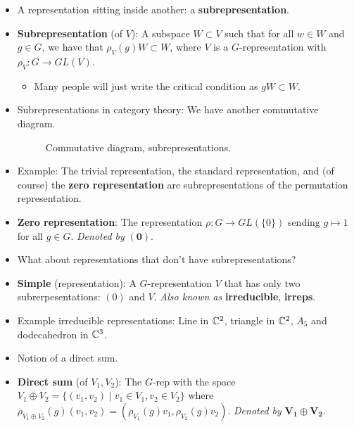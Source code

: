 \documentclass[../notes.tex]{subfiles}
\begin{document}
\begin{itemize}
    \item A representation sitting inside another: a \textbf{subrepresentation}.
    \item \textbf{Subrepresentation} (of $V$): A subspace $W\subset V$ such that for all $w\in W$ and $g\in G$, we have that $\rho_V(g)W\subset W$, where $V$ is a $G$-representation with $\rho_V:G\to GL(V)$.
    \begin{itemize}
        \item Many people will just write the critical condition as $gW\subset W$.
    \end{itemize}
    \item Subrepresentations in category theory: We have another commutative diagram.
    \begin{figure}[h!]
        \centering
        \DisableQuotes
        \EnableQuotes
        \vspace{-1.5em}
        \caption{Commutative diagram, subrepresentations.}
        \label{fig:CDsubreps}
    \end{figure}
    \item Example: The trivial representation, the standard representation, and (of course) the \textbf{zero representation} are subrepresentations of the permutation representation.
    \item \textbf{Zero representation}: The representation $\rho:G\to GL(\{0\})$ sending $g\mapsto 1$ for all $g\in G$. \emph{Denoted by} $\bm{(0)}$.
    \item What about representations that don't have subrepresentations?
    \item \textbf{Simple} (representation): A $G$-representation $V$ that has only two subrerpesentations: $(0)$ and $V$. \emph{Also known as} \textbf{irreducible}, \textbf{irreps}.
    \item Example irreducible representations: Line in $\mathbb{C}^2$, triangle in $\mathbb{C}^2$, $A_5$ and dodecahedron in $\mathbb{C}^3$.
    \item Notion of a direct sum.
    \item \textbf{Direct sum} (of $V_1,V_2$): The $G$-rep with the space $V_1\oplus V_2=\{(v_1,v_2)\mid v_1\in V_1,v_2\in V_2\}$ where $\rho_{V_1\oplus V_2}(g)(v_1,v_2)=(\rho_{V_1}(g)v_1,\rho_{V_2}(g)v_2)$. \emph{Denoted by} $\bm{V_1\oplus V_2}$.

\end{itemize}
\end{document}
